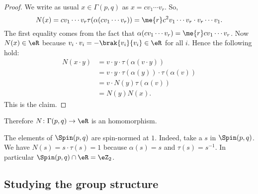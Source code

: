 \begin{proof}
	We write as usual $x\in\Gamma(p,q)$ as $x=cv_1\cdots v_r$. So,
	\begin{equation}
		N(x)=cv_1\cdots v_r\tau(\alpha(cv_1\cdots v_r))
		=\me{r}c^2v_1\cdots v_r\cdot v_r\cdots v_1.
	\end{equation}
	The first equality comes from the fact that $\alpha(cv_1\cdots v_r)=\me{r}cv_1\cdots v_r$. Now $N(x)\in\eR$ because $v_i\cdot v_i=-\brak{v_i}{v_i}\in\eR$ for all $i$. Hence the following hold:
	\begin{equation}
		\begin{split}
			N(x\cdot y)&=v\cdot y\cdot\tau(\alpha(v\cdot y))\\
			&=v\cdot y\cdot\tau(\alpha(y))\cdot\tau(\alpha(v))\\
			&=v\cdot N(y)\tau(\alpha(v))\\
			&=N(y)N(x).
		\end{split}
	\end{equation}
	This is the claim.
\end{proof}

Therefore  $N\colon \Gamma(p,q)\to \eR$ is an homomorphism.

\begin{remark}
	The elements of $\Spin(p,q)$ are spin-normed at $1$. Indeed, take a $s$ in $\Spin(p,q)$. We have $N(s)=s\cdot \tau(s)=1$ because $\alpha(s)=s$ and $\tau(s)=s^{-1}$. In particular $\Spin(p,q)\cap\eR=\eZ_{2}$.
	\label{rem:spin_norm_u}
\end{remark}

\subsection{Studying the group structure}

